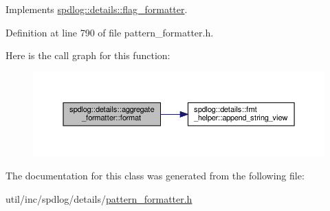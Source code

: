 Implements \hyperlink{classspdlog_1_1details_1_1flag__formatter_a33fb3e42a4c8200cceb833d92b53fb67}{spdlog\+::details\+::flag\+\_\+formatter}.



Definition at line 790 of file pattern\+\_\+formatter.\+h.

Here is the call graph for this function\+:
\nopagebreak
\begin{figure}[H]
\begin{center}
\leavevmode
\includegraphics[width=350pt]{classspdlog_1_1details_1_1aggregate__formatter_a19bcf6f721f9a3b2758a59293305987d_cgraph}
\end{center}
\end{figure}


The documentation for this class was generated from the following file\+:\begin{DoxyCompactItemize}
\item 
util/inc/spdlog/details/\hyperlink{pattern__formatter_8h}{pattern\+\_\+formatter.\+h}\end{DoxyCompactItemize}
